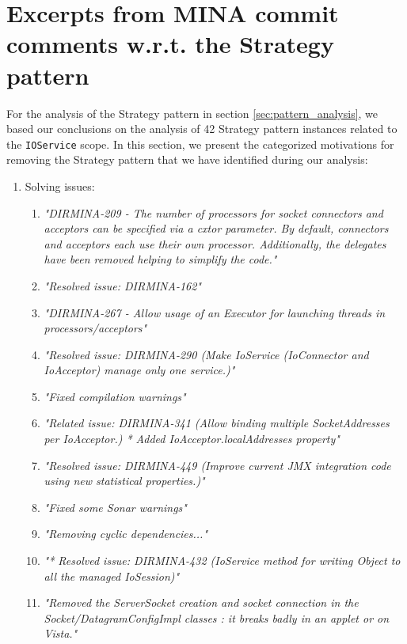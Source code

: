 \section{Excerpts from MINA commit comments w.r.t. the Strategy pattern}
\label{sec:strategy_motivation}
For the analysis of the Strategy pattern in section \ref{sec:pattern_analysis}, we based our conclusions on the analysis of 42 Strategy pattern instances related to the \texttt{IOService} scope. In this section, we present the categorized motivations for removing the Strategy pattern that we have identified during our analysis:
\begin{enumerate}
    \item Solving issues:
  
            \begin{enumerate}
                \item \textit{"DIRMINA-209 - The number of processors for socket connectors and acceptors can be specified via a cxtor parameter. By default, connectors and acceptors each use their own processor.
                Additionally, the delegates have been removed helping to simplify the code."}
                \item \textit{"Resolved issue: DIRMINA-162"}
                \item \textit{"DIRMINA-267 - Allow usage of an Executor for launching threads in processors/acceptors"}
                \item \textit{"Resolved issue: DIRMINA-290 (Make IoService (IoConnector and IoAcceptor) manage only one service.)"}
                \item \textit{"Fixed compilation warnings"}
                \item \textit{"Related issue: DIRMINA-341 (Allow binding multiple SocketAddresses per IoAcceptor.)
                * Added IoAcceptor.localAddresses property"}
                \item \textit{"Resolved issue: DIRMINA-449 (Improve current JMX integration code using new statistical properties.)"}
                \item \textit{"Fixed some Sonar warnings"}
                \item \textit{"Removing cyclic dependencies..."}
                \item \textit{"* Resolved issue: DIRMINA-432 (IoService method for writing Object to all the managed IoSession)"}
                \item \textit{"Removed the ServerSocket creation and socket connection in the Socket/DatagramConfigImpl classes : it breaks badly in an applet or on Vista."}
            \end{enumerate}
    

\end{enumerate}
